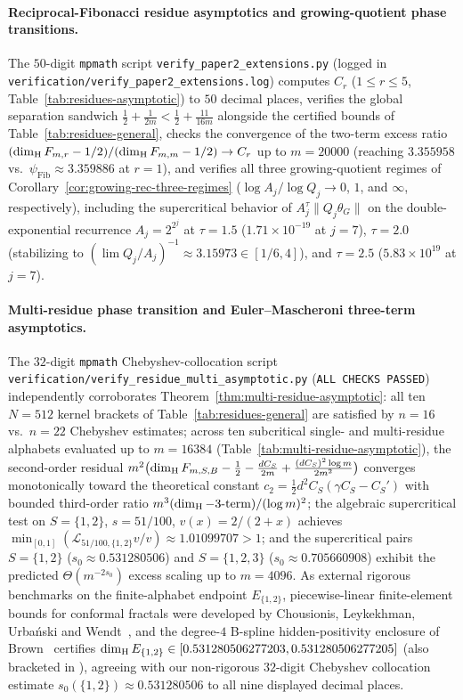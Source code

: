 \paragraph{Reciprocal-Fibonacci residue asymptotics and growing-quotient phase transitions.}
The $50$-digit \texttt{mpmath} script
\texttt{verify\_\allowbreak paper2\_\allowbreak extensions.py} (logged in
\texttt{verification/\allowbreak verify\_\allowbreak paper2\_\allowbreak extensions.log})
computes $C_r$ ($1\le r\le 5$, Table~\ref{tab:residues-asymptotic}) to $50$ decimal
places, verifies the global separation sandwich
$\frac12+\frac{1}{2m}<\frac12+\frac{11}{16m}$ alongside the certified bounds of
Table~\ref{tab:residues-general}, checks the convergence of the two-term
excess ratio $(\dim_{\mathrm{H}} F_{m,r}-1/2)/(\dim_{\mathrm{H}} F_{m,m}-1/2)\to C_r$ up to $m=20000$
(reaching $3.355958$ vs.\ $\psi_{\mathrm{Fib}}\approx3.359886$ at $r=1$), and
verifies all three growing-quotient regimes of
Corollary~\ref{cor:growing-rec-three-regimes} ($\log A_j/\log Q_j\to 0$, $1$,
and $\infty$, respectively), including the supercritical behavior of
$A_j^\tau\|Q_j\theta_G\|$ on the double-exponential recurrence $A_j=2^{2^j}$ at
$\tau=1.5$ ($1.71\times10^{-19}$ at $j=7$), $\tau=2.0$ (stabilizing to
$(\lim Q_j/A_j)^{-1}\approx 3.15973\in[1/6,4]$), and $\tau=2.5$
($5.83\times10^{19}$ at $j=7$).

\paragraph{Multi-residue phase transition and Euler--Mascheroni three-term asymptotics.}
The $32$-digit \texttt{mpmath} Chebyshev-collocation script
\texttt{verification/\allowbreak verify\_\allowbreak residue\_\allowbreak multi\_\allowbreak asymptotic.py}
(\texttt{ALL CHECKS PASSED}) independently corroborates Theorem~\ref{thm:multi-residue-asymptotic}:
all ten $N=512$ kernel brackets of Table~\ref{tab:residues-general} are
satisfied by $n=16$ vs.\ $n=22$ Chebyshev estimates; across ten subcritical
single- and multi-residue alphabets evaluated up to $m=16384$
(Table~\ref{tab:multi-residue-asymptotic}), the second-order residual
$m^2\bigl(\dim_{\mathrm{H}} F_{m,S,B}-\frac12-\frac{dC_S}{2m}+\frac{(dC_S)^2\log m}{2m^2}\bigr)$
converges monotonically toward the theoretical constant
$c_2=\frac12 d^2 C_S(\gamma C_S-C_S')$ with bounded third-order ratio
$m^3(\dim_{\mathrm{H}}-\text{3-term})/(\log m)^2$; the algebraic supercritical test on
$S=\{1,2\}$, $s=51/100$, $v(x)=2/(2+x)$ achieves
$\min_{[0,1]}(\mathcal L_{51/100,\{1,2\}}v/v)\approx1.01099707>1$; and the
supercritical pairs $S=\{1,2\}$ ($s_0\approx0.531280506$) and $S=\{1,2,3\}$
($s_0\approx0.705660908$) exhibit the predicted $\Theta(m^{-2s_0})$ excess
scaling up to $m=4096$.
As external rigorous benchmarks on the finite-alphabet endpoint $E_{\{1,2\}}$,
piecewise-linear finite-element bounds for conformal fractals were developed by
Chousionis, Leykekhman, Urba\'nski and Wendt~\cite{CLUW2024}, and the degree-$4$
B-spline hidden-positivity enclosure of Brown~\cite{Brown2026} certifies
$\dim_{\mathrm{H}} E_{\{1,2\}}\in[0.531280506277203, 0.531280506277205]$ (also bracketed in
\cite[Table~1]{CLN2026}), agreeing with our non-rigorous $32$-digit Chebyshev
collocation estimate $s_0(\{1,2\})\approx0.531280506$ to all nine displayed decimal places.

